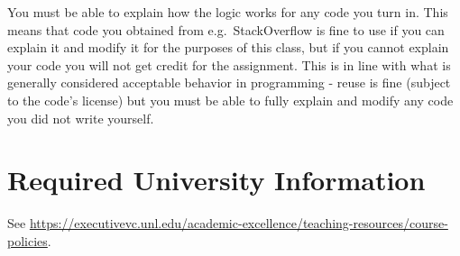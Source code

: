 \documentclass[
  11pt,
  letterpaper,
  DIV=11,
  numbers=noendperiod]{scrartcl}
\begin{document}
You must be able to explain how the logic works for any code you turn
in. This means that code you obtained from e.g.~StackOverflow is fine to
use if you can explain it and modify it for the purposes of this class,
but if you cannot explain your code you will not get credit for the
assignment. This is in line with what is generally considered acceptable
behavior in programming - reuse is fine (subject to the code's license)
but you must be able to fully explain and modify any code you did not
write yourself.

\hypertarget{required-university-information}{%
\section{Required University
Information}\label{required-university-information}}

See
\url{https://executivevc.unl.edu/academic-excellence/teaching-resources/course-policies}.
\end{document}
